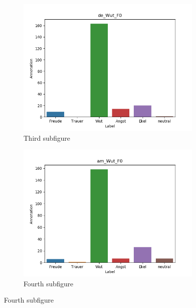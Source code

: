 \documentclass[11pt,a4paper,headsepline,twoside,toc=bibliography]{scrreprt}
\begin{document}
\begin{figure}[t!]
	\medskip
	\begin{subfigure}{0.48\textwidth}
		\includegraphics[width=\linewidth]{plots/de_Wut_F0.png}
		\caption{Third subfigure} \label{fig:de_W_F0}
	\end{subfigure}\hspace*{\fill}
	\begin{subfigure}{0.48\textwidth}
		\includegraphics[width=\linewidth]{plots/am_Wut_F0.png}
		\caption{Fourth subfigure} \label{fig:am_W_F0}
	\end{subfigure}
	

\end{figure}
\end{document}
